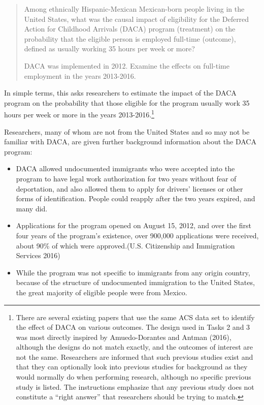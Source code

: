 \documentclass[
  letterpaper,
  DIV=11,
  numbers=noendperiod]{scrartcl}
\begin{document}
\begin{quote}
Among ethnically Hispanic-Mexican Mexican-born people living in the
United States, what was the causal impact of eligibility for the
Deferred Action for Childhood Arrivals (DACA) program (treatment) on the
probability that the eligible person is employed full-time (outcome),
defined as usually working 35 hours per week or more?

DACA was implemented in 2012. Examine the effects on full-time
employment in the years 2013-2016.
\end{quote}

In simple terms, this asks researchers to estimate the impact of the
DACA program on the probability that those eligible for the program
usually work 35 hours per week or more in the years
2013-2016.\footnote{There are several existing papers that use the same
  ACS data set to identify the effect of DACA on various outcomes. The
  design used in Tasks 2 and 3 was most directly inspired by
  Amuedo-Dorantes and Antman (2016), although the designs do not match
  exactly, and the outcomes of interest are not the same. Researchers
  are informed that such previous studies exist and that they can
  optionally look into previous studies for background as they would
  normally do when performing research, although no specific previous
  study is listed. The instructions emphasize that any previous study
  does not constitute a ``right answer'' that researchers should be
  trying to match.}

Researchers, many of whom are not from the United States and so may not
be familiar with DACA, are given further background information about
the DACA program:

\begin{itemize}
\item
  DACA allowed undocumented immigrants who were accepted into the
  program to have legal work authorization for two years without fear of
  deportation, and also allowed them to apply for drivers' licenses or
  other forms of identification. People could reapply after the two
  years expired, and many did.
\item
  Applications for the program opened on August 15, 2012, and over the
  first four years of the program's existence, over 900,000 applications
  were received, about 90\% of which were approved.(U.S. Citizenship and
  Immigration Services 2016)
\item
  While the program was not specific to immigrants from any origin
  country, because of the structure of undocumented immigration to the
  United States, the great majority of eligible people were from Mexico.
\end{itemize}
\end{document}
